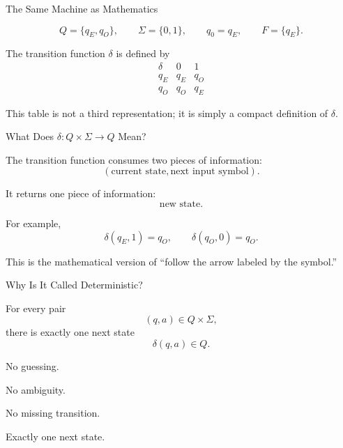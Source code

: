 \documentclass[10pt,aspectratio=169]{beamer}
\begin{document}
\begin{frame}{The Same Machine as Mathematics}

\[
Q=\{q_E,q_O\},
\qquad
\Sigma=\{0,1\},
\qquad
q_0=q_E,
\qquad
F=\{q_E\}.
\]

\pause

The transition function $\delta$ is defined by
\[
\begin{array}{c|cc}
\delta & 0 & 1\\
\hline
q_E & q_E & q_O\\
q_O & q_O & q_E
\end{array}
\]

\pause

This table is not a third representation; it is simply a compact definition of $\delta$.

\end{frame}

\begin{frame}{What Does $\delta:Q\times\Sigma\to Q$ Mean?}

The transition function consumes two pieces of information:
\[
(\text{current state},\text{next input symbol}).
\]

\pause

It returns one piece of information:
\[
\text{new state}.
\]

\pause

For example,
\[
\delta(q_E,1)=q_O,
\qquad
\delta(q_O,0)=q_O.
\]

\pause

This is the mathematical version of ``follow the arrow labeled by the symbol.''

\end{frame}

\begin{frame}{Why Is It Called Deterministic?}

For every pair
\[
(q,a)\in Q\times\Sigma,
\]
there is exactly one next state
\[
\delta(q,a)\in Q.
\]

\vspace{1em}

\pause

No guessing.

No ambiguity.

No missing transition.

Exactly one next state.

\end{frame}
\end{document}
